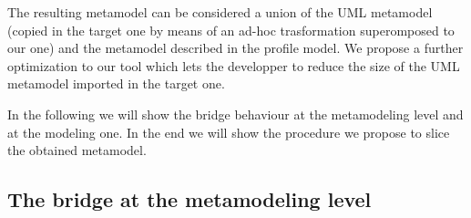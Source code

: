 The resulting metamodel can be considered a union of the UML metamodel (copied in the target one by means of an ad-hoc trasformation superomposed to our one) and the metamodel described in the profile model. We propose a further optimization to our tool which lets the developper to reduce the size of the UML metamodel imported in the target one.

In the following we will show the bridge behaviour at the metamodeling level and at the modeling one. In the end we will show the procedure we propose to slice the obtained metamodel.

\subsection{The bridge at the metamodeling level}\label{sec:metamodelLevel}

